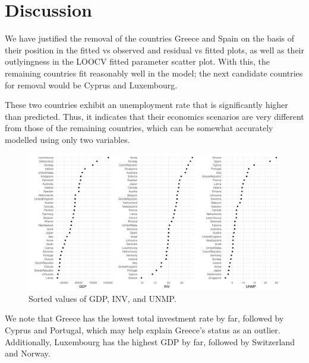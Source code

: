 \documentclass[10pt]{article}
\begin{document}
    \section{Discussion}

    We have justified the removal of the countries Greece and Spain on the basis of
    their position in the fitted vs observed and residual vs fitted plots, as well as
    their outlyingness in the LOOCV fitted parameter scatter plot. With this, the
    remaining countries fit reasonably well in the model; the next candidate
    countries for removal would be Cyprus and Luxembourg.

    These two countries exhibit an unemployment rate that is significantly higher
    than predicted. Thus, it indicates that their economics scenarios are very
    different from those of the remaining countries, which can be somewhat accurately
    modelled using only two variables.

    \begin{figure}[H]
    \begin{center}
        \includegraphics[width=\textwidth]{gdp_inv_unmp.png}
    \end{center}
    \caption{Sorted values of GDP, INV, and UNMP.}
    \label{fig:gdp_inv_unmp}
    \end{figure}

    We note that Greece has the lowest total investment rate by far, followed by
    Cyprus and Portugal, which may help explain Greece's status as an outlier.
    Additionally, Luxembourg has the highest GDP by far, followed by Switzerland and
    Norway.
\end{document}
